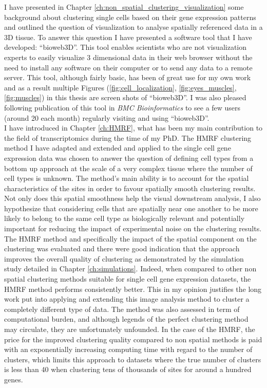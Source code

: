 I have presented in Chapter \ref{ch:non_spatial_clustering_visualization} some background about clustering single cells based on their gene expression patterns and outlined the question of visualization to analyse spatially referenced data in a 3D tissue. To answer this question I have presented a software tool that I have developed: ``bioweb3D''. This tool enables scientists who are not visualization experts to easily visualize 3 dimensional data in their web browser without the need to install any software on their computer or to send any data to a remote server. This tool, although fairly basic, has been of great use for my own work and as a result multiple Figures (\ref{fig:cell_localization}, \ref{fig:eyes_muscles}, \ref{fig:muscles}) in this thesis are screen shots of ``bioweb3D''. I was also pleased following publication of this tool in \emph{BMC Bioinformatics} \citep{Pettit13} to see a few users (around 20 each month) regularly visiting and using ``bioweb3D''.\\


I have introduced in Chapter \ref{ch:HMRF}, what has been my main contribution to the field of transcriptomics during the time of my PhD. The HMRF clustering method I have adapted and extended and applied to the single cell gene expression data was chosen to answer the question of defining cell types from a bottom up approach at the scale of a very complex tissue where the number of cell types is unknown. The method's main ability is to account for the spatial characteristics of the sites in order to favour spatially smooth clustering results. Not only does this spatial smoothness help the visual downstream analysis, I also hypothesize that considering cells that are spatially near one another to be more likely to belong to the same cell type as biologically relevant and potentially important for reducing the impact of experimental noise on the clustering results.\\

 The HMRF method and specifically the impact of the spatial component on the clustering was evaluated and there were good indication that the approach improves the overall quality of clustering as demonstrated by the simulation study detailed in Chapter \ref{ch:simulations}. Indeed, when compared to other non spatial clustering methods suitable for single cell gene expression datasets, the HMRF method performs consistently better. This in my opinion justifies the long work put into applying and extending this image analysis method to cluster a completely different type of data. The method was also assessed in term of computational burden, and although legends of the perfect clustering method may circulate, they are unfortunately unfounded. In the case of the HMRF, the price for the improved clustering quality compared to non spatial methods is paid with an exponentially increasing computing time with regard to the number of clusters, which limits this approach to datasets where the true number of clusters is less than 40 when clustering tens of thousands of sites for around a hundred genes. \\
 
